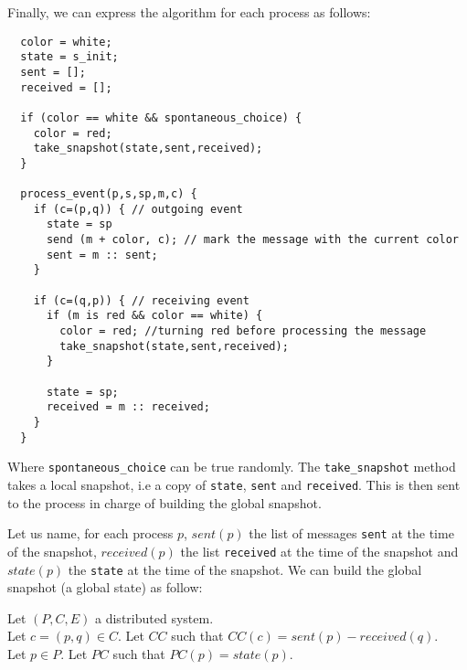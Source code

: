 \documentclass{article}
\begin{document}

    
Finally, we can express the algorithm for each process as follows:
\begin{lstlisting}
  color = white;
  state = s_init;
  sent = [];
  received = [];

  if (color == white && spontaneous_choice) {
    color = red;
    take_snapshot(state,sent,received);
  }

  process_event(p,s,sp,m,c) {
    if (c=(p,q)) { // outgoing event
      state = sp
      send (m + color, c); // mark the message with the current color
      sent = m :: sent;
    }

    if (c=(q,p)) { // receiving event
      if (m is red && color == white) {
        color = red; //turning red before processing the message
        take_snapshot(state,sent,received);
      }
      
      state = sp;
      received = m :: received;
    }
  }
\end{lstlisting}

Where \lstinline{spontaneous_choice} can be true randomly.
The \lstinline{take_snapshot} method takes a local snapshot, i.e a copy of \lstinline{state}, \lstinline{sent} and \lstinline{received}. This is then sent to the process in charge of building the global snapshot.

Let us name, for each process $p$, $\mathit{sent}(p)$ the list of messages \lstinline{sent} at the time of the snapshot, $\mathit{received}(p)$ the list \lstinline{received} at the time of the snapshot and $\mathit{state}(p)$ the \lstinline{state} at the time of the snapshot.
We can build the global snapshot (a global state) as follow:

Let $(P,C,E)$ a distributed system.\\
Let $c=(p,q)\in C$. Let $CC$ such that $CC(c) = \mathit{sent}(p) - \mathit{received}(q)$.\\
Let $p\in P$. Let $PC$ such that $PC(p)=\mathit{state}(p)$.
\end{document}
